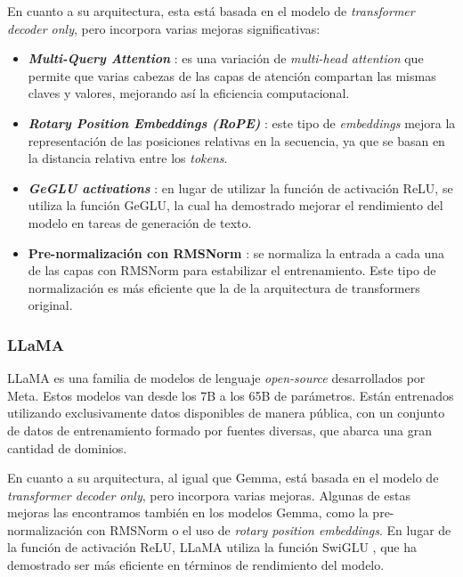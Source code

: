 \documentclass[11pt,spanish,listoffigures,listoftables]{tfgetsinf}
\begin{document}
En cuanto a su arquitectura, esta está basada en el modelo de \textit{transformer decoder only}, pero incorpora varias mejoras significativas:

\begin{itemize}
	\item \textbf{\textit{Multi-Query Attention}} \cite{shazeer2019fasttransformerdecodingwritehead}: es una variación de \textit{multi-head attention} que permite que varias cabezas de las capas de atención compartan las mismas claves y valores, mejorando así la eficiencia computacional.
	\item \textbf{\textit{Rotary Position Embeddings (RoPE)}} \cite{su2023roformerenhancedtransformerrotary}: este tipo de \textit{embeddings} mejora la representación de las posiciones relativas en la secuencia, ya que se basan en la distancia relativa entre los \textit{tokens}.
	\item \textbf{\textit{GeGLU activations}} \cite{shazeer2020gluvariantsimprovetransformer}: en lugar de utilizar la función de activación ReLU, se utiliza la función GeGLU, la cual ha demostrado mejorar el rendimiento del modelo en tareas de generación de texto.
	\item \textbf{Pre-normalización con RMSNorm} \cite{zhang2019rootmeansquarelayer}: se normaliza la entrada a cada una de las capas con RMSNorm para estabilizar el entrenamiento. Este tipo de normalización es más eficiente que la de la arquitectura de transformers original.
\end{itemize}

\subsubsection{LLaMA}

LLaMA \cite{touvron2023llamaopenefficientfoundation} es una familia de modelos de lenguaje \textit{open-source} desarrollados por Meta. Estos modelos van desde los 7B a los 65B de parámetros. Están entrenados utilizando exclusivamente datos disponibles de manera pública, con un conjunto de datos de entrenamiento formado por fuentes diversas, que abarca una gran cantidad de dominios.

En cuanto a su arquitectura, al igual que Gemma, está basada en el modelo de \textit{transformer decoder only}, pero incorpora varias mejoras. Algunas de estas mejoras las encontramos también en los modelos Gemma, como la pre-normalización con RMSNorm o el uso de \textit{rotary position embeddings}. En lugar de la función de activación ReLU, LLaMA utiliza la función SwiGLU \cite{shazeer2020gluvariantsimprovetransformer}, que ha demostrado ser más eficiente en términos de rendimiento del modelo.
\end{document}
